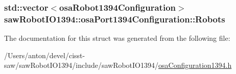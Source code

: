 \subsubsection[{Robots}]{\setlength{\rightskip}{0pt plus 5cm}std\+::vector$<${\bf osa\+Robot1394\+Configuration}$>$ saw\+Robot\+I\+O1394\+::osa\+Port1394\+Configuration\+::\+Robots}\label{structsaw_robot_i_o1394_1_1osa_port1394_configuration_ad6f5d420583316ff00715bf069fa8f99}


The documentation for this struct was generated from the following file\+:\begin{DoxyCompactItemize}
\item 
/\+Users/anton/devel/cisst-\/saw/saw\+Robot\+I\+O1394/include/saw\+Robot\+I\+O1394/\hyperlink{osa_configuration1394_8h}{osa\+Configuration1394.\+h}\end{DoxyCompactItemize}
